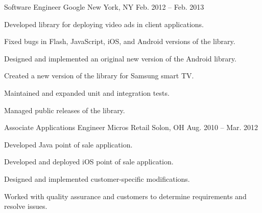 \begin{cventries}
  \cventry
    {Software Engineer} %
    {Google} %
    {New York, NY} %
    {Feb. 2012 – Feb. 2013} %
    {
      \begin{cvitems} %
        \item {Developed library for deploying video ads in client applications.}
        \item {Fixed bugs in Flash, JavaScript, iOS, and Android versions of the library.}
        \item {Designed and implemented an original new version of the Android library.}
        \item {Created a new version of the library for Samsung smart TV.}
        \item {Maintained and expanded unit and integration tests.}
        \item {Managed public releases of the library.}
      \end{cvitems}
    }

  \cventry
    {Associate Applications Engineer} %
    {Micros Retail} %
    {Solon, OH} %
    {Aug. 2010 – Mar. 2012} %
    {
      \begin{cvitems} %
        \item {Developed Java point of sale application.}
        \item {Developed and deployed iOS point of sale application.}
        \item {Designed and implemented customer-specific modifications.}
        \item {Worked with quality assurance and customers to determine requirements and resolve issues.}
      \end{cvitems}
    }

\end{cventries}

